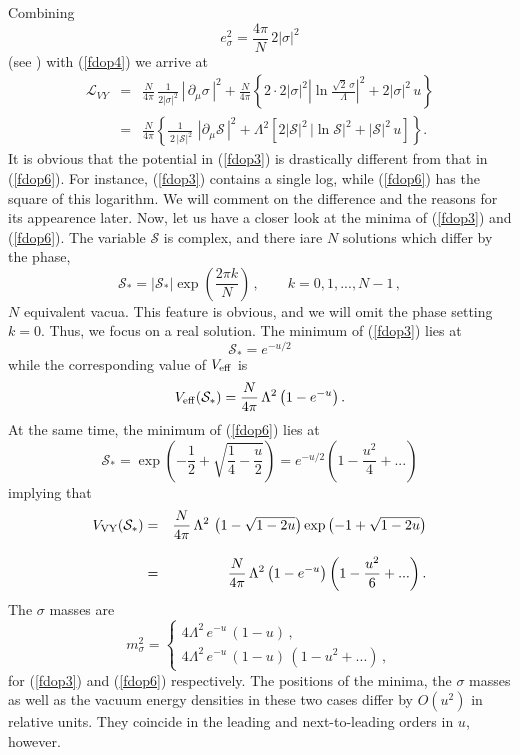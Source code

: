 \documentclass[epsfig,12pt]{article}
\def\beq{\begin{equation}}
\def\eeq{\end{equation}}
\def\beqn{\begin{eqnarray}}
\def\eeqn{\end{eqnarray}}
\newcommand{\cs}{{\mathcal S}}
\def\beqn{\begin{eqnarray}}
\def\eeqn{\end{eqnarray}}
\def\beq{\begin{equation}}
\def\eeq{\end{equation}}
\begin{document}
{Combining 
\beq
e^2_\sigma =\frac{4\pi}{N}\,2|\sigma|^2
\label{fdop5} 
\eeq
(see \cite{SYhet}) with (\ref{fdop4}) we arrive at
\beqn
{\mathcal L}_{VY} 
&=&\frac{N}{4\pi}\,\frac{1}{2|\sigma|^2}\,| \,  \partial_\mu\sigma \,|^2+
 \frac{N}{4\pi}
\left\{ 2\cdot 2|\sigma|^2
 \left|
\ln\frac{\sqrt{2}\, \sigma}{\Lambda}\right|^2
+2|\sigma|^2\, u\right\}
\nonumber\\[3mm]
&=& \frac{N}{4\pi}
\left\{
\frac{1}{\,2\, |\cs|^2}\,\,
 | \partial_\mu\cs \, |^2
 +\Lambda^2
 \left[2|\cs |^2\,\left|\ln \cs\right|^2 + |\cs|^2\,u
 \right]
 \right\}.
 \label{fdop6}
\eeqn
It is obvious that the potential in (\ref{fdop3})
is drastically different from that in (\ref{fdop6}). 
For instance, (\ref{fdop3}) contains a single log, while (\ref{fdop6}) has the square of this logarithm.
We will comment on the difference and the reasons for its appearence \cite{DADA}
later. Now, let us have a closer look at the minima of
(\ref{fdop3}) and (\ref{fdop6}). The variable $\cs$ is complex, and there iare $N$ solutions
which differ by the phase,
\beq
\cs_* = \left|\cs_* \right|\exp\left(\frac{2\pi k}{N}\right)\,,\qquad k = 0,1, ..., N-1\,,
\eeq
$N$ equivalent vacua. This feature is obvious, and we will omit the phase setting $k=0$.
Thus, we focus on a real solution.
The minimum of (\ref{fdop3}) lies at
 \beq
 \cs_* = e^{-u/2}
 \label{wdop1}
 \eeq
while the corresponding value of $V_{\rm eff}$ is
\beq
V_{\rm eff} (\cs_* ) = \frac{N}{4\pi}\,\Lambda^2 \left(1- e^{-u}
\right)  .
 \label{wdop2}
\eeq
At the same time, the minimum of (\ref{fdop6}) lies at
\beq
\cs_* = \exp\left(-\frac{1}{2} + \sqrt{\frac{1}{4}-\frac{u}{2}}\right) =  e^{-u/2}\left(1-\frac{u^2}{4} + ...
\right)
\label{wdop3}
\eeq
implying that 
\beqn
V_{\rm VY} (\cs_* )
&=&  \frac{N}{4\pi}\,\Lambda^2 \,\left({1} - \sqrt{{1}-2 {u}} \right)\exp\left(-{1} + \sqrt{{1}-2 {u}}\right)
\nonumber\\[3mm]
& =&
  \frac{N}{4\pi}\,\Lambda^2 \left(1- e^{-u}
\right) \left(1-\frac{u^2}{6}  + ...
\right) .
\label{wdop5}
\eeqn 
The $\sigma$ masses are
\beq
m_\sigma^2 = \left\{
\begin{array}{l}
4\Lambda^2\,e^{-u}\,(1-u)\,,\\[2mm]
4\Lambda^2\,e^{-u}\,(1-u)\,(1-u^2+...)\,,
\end{array}
\right.
\label{wdop4}
\eeq
for (\ref{fdop3}) and (\ref{fdop6}) respectively.
The positions of the minima, the $\sigma$ masses
as well as the vacuum energy densities in these two cases
differ by $O(u^2)$ in relative units. They coincide in the leading and next-to-leading orders in $u$, however.

}
\end{document}
